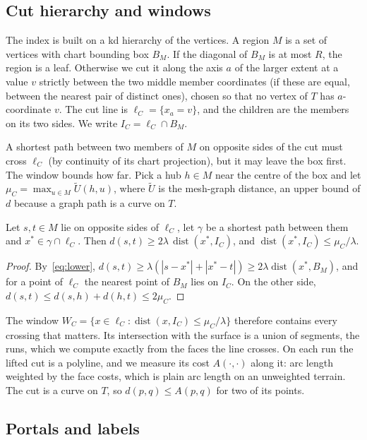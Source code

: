 \documentclass[sigconf,nonacm,screen]{acmart}
\newcommand{\dist}{\operatorname{dist}}
\begin{document}
\subsection{Cut hierarchy and windows}

The index is built on a kd hierarchy of the vertices. A region $M$ is a set of vertices with chart bounding
box $B_M$. If the diagonal of $B_M$ is at most $R$, the region is a leaf. Otherwise we cut it along the axis
$a$ of the larger extent at a value $v$ strictly between the two middle member coordinates (if these are equal,
between the nearest pair of distinct ones), chosen so that no vertex of $T$ has $a$-coordinate $v$. The cut line is $\ell_C=\{x_a=v\}$, and the children are the
members on its two sides. We write $I_C=\ell_C\cap B_M$.

A shortest path between two members of $M$ on opposite sides of the cut must cross $\ell_C$ (by continuity of
its chart projection), but it may leave the box first. The window bounds how far. Pick a hub $h\in M$ near
the centre of the box and let $\mu_C = \max_{u\in M}\tilde U(h,u)$, where $\tilde U$ is the mesh-graph
distance, an upper bound of $d$ because a graph path is a curve on $T$.
\begin{lemma}[window]
\label{lem:window}
Let $s,t\in M$ lie on opposite sides of $\ell_C$, let $\gamma$ be a shortest path between them and
$x^\ast\in\gamma\cap\ell_C$. Then $d(s,t)\ge 2\lambda\,\dist(x^\ast,I_C)$, and $\dist(x^\ast,I_C)\le\mu_C/\lambda$.
\end{lemma}
\begin{proof}
By~\eqref{eq:lower}, $d(s,t)\ge\lambda(|s-x^\ast|+|x^\ast-t|)\ge 2\lambda\dist(x^\ast,B_M)$, and for a point
of $\ell_C$ the nearest point of $B_M$ lies on $I_C$. On the other side, $d(s,t)\le d(s,h)+d(h,t)\le 2\mu_C$.
\end{proof}
The window $W_C=\{x\in\ell_C:\dist(x,I_C)\le\mu_C/\lambda\}$ therefore contains every crossing that matters.
Its intersection with the surface is a union of segments, the runs, which we compute exactly from the faces
the line crosses. On each run the lifted cut is a polyline, and we measure its cost $A(\cdot,\cdot)$ along it: arc
length weighted by the face costs, which is plain arc length on an unweighted terrain. The cut is a curve on $T$,
so $d(p,q)\le A(p,q)$ for two of its points.

\subsection{Portals and labels}
\end{document}
